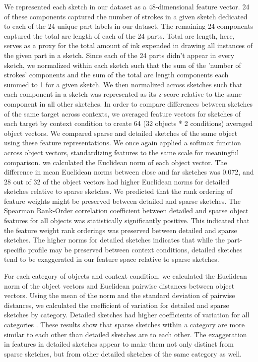 \documentclass[10pt,letterpaper]{article}
\newcommand{\kushin}[1]{{\color{orange}{[kushin: #1]}}}
\begin{document}
We represented each sketch in our dataset as a 48-dimensional feature vector. 
24 of these components captured the number of strokes in a given sketch dedicated to each of the 24 unique part labels in our dataset. The remaining 24 components captured the total arc length of each of the 24 parts. Total arc length, here, serves as a proxy for the total amount of ink expended in drawing all instances of the given part in a sketch. Since each of the 24 parts didn't appear in every sketch, we normalized within each sketch such that the sum of the 'number of strokes' components and the sum of the total arc length components each summed to 1 for a given sketch. We then normalized across sketches such that each component in a sketch was represented as its z-score relative to the same component in all other sketches. In order to compare differences between sketches of the same target across contexts, we averaged feature vectors for sketches of each target by context condition to create 64 (32 objects * 2 conditions) averaged object vectors.
We compared sparse and detailed sketches of the same object using these feature representations. 
We once again applied a softmax function across object vectors, standardizing features to the same scale for meaningful comparison.
we calculated the Euclidean norm of each object vector. The difference in mean Euclidean norms between close and far sketches was 0.072, and 28 out of 32 of the object vectors had higher Euclidean norms for detailed sketches relative to sparse sketches. We predicted that the rank ordering of feature weights might be preserved between detailed and sparse sketches. The Spearman Rank-Order correlation coefficient between detailed and sparse object features for all objects was statistically significantly positive. This indicated that the feature weight rank orderings was preserved between detailed and sparse sketches. The higher norms for detailed sketches indicates that while the part-specific profile may be preserved between context conditions, detailed sketches tend to be exaggerated in our feature space relative to sparse sketches.

For each category of objects and context condition, we calculated the Euclidean norm of the object vectors and Euclidean pairwise distances between object vectors. 
Using the mean of the norm and the standard deviation of pairwise distances, we calculated the coefficient of variation for detailed and sparse sketches by category. Detailed sketches had higher coefficients of variation for all categories \kushin{would report CV difference between close and far maybe?}.
These results show that sparse sketches within a category are more similar to each other than detailed sketches are to each other. 
The exaggeration in features in detailed sketches appear to make them not only distinct from sparse sketches, but from other detailed sketches of the same category as well.
 
\end{document}
